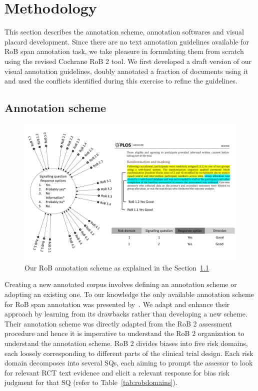 \documentclass[sn-mathphys,Numbered]{sn-jnl}%
\theoremstyle{thmstyleone}%
\theoremstyle{thmstyletwo}%
\theoremstyle{thmstylethree}%
\begin{document}
\section{Methodology}
\label{sec:methods}
%
This section describes the annotation scheme, annotation softwares and visual placard development.
Since there are no text annotation guidelines available for RoB span annotation task, we take pleasure in formulating them from scratch using the revised Cochrane RoB 2 tool.
We first developed a draft version of our visual annotation guidelines, doubly annotated a fraction of documents using it and used the conflicts identified during this exercise to refine the guidelines.
%
%
%
\subsection{Annotation scheme}
\label{met:annot_scheme}
%

%
%
%
\begin{figure}
    \centering
    \includegraphics[width=0.99\columnwidth]{figures/annotation_schema.pdf}
    \caption{Our RoB annotation scheme as explained in the Section~\ref{met:annot_scheme}}
    \label{fig:annotationscheme}
\end{figure}
%
%
%



Creating a new annotated corpus involves defining an annotation scheme or adopting an existing one.
To our knowledge the only available annotation scheme for RoB span annotation was presented by~\cite{dhrangadhariya2023first}.
We adapt and enhance their approach by learning from its drawbacks rather than developing a new scheme.
Their annotation scheme was directly adapted from the RoB 2 assessment procedure and hence it is imperative to understand the RoB 2 organization to understand the annotation scheme.
RoB 2 divides biases into five risk domains, each loosely corresponding to different parts of the clinical trial design.
Each risk domain decomposes into several SQs, each aiming to prompt the assessor to look for relevant RCT text evidence and elicit a relevant response for bias risk judgment for that SQ (refer to Table~\ref{tab:robdomains}).
\end{document}
